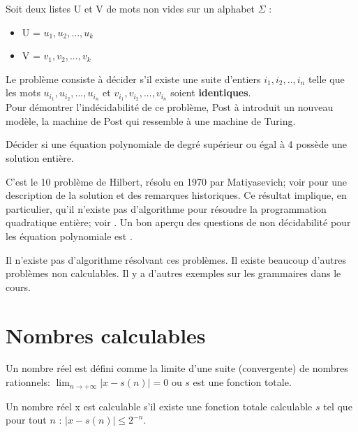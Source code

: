 \begin{mydef} Soit deux listes U et V
	de mots non vides sur un alphabet $\Sigma$ :
	\begin{itemize}
		\item U = ${u_1,u_2,...,u_k}$
		\item V = ${v_1,v_2,...,v_k}$
	\end{itemize}
	Le problème consiste à décider s’il existe une suite d'entiers
	$i_1,i_2,..,i_n$ telle que les mots $u_{i_1},u_{i_2},...,u_{i_n}$ et
	$v_{i_1},v_{i_2},...,v_{i_n}$ soient \textbf{identiques}. \\
	Pour démontrer l'indécidabilité de ce problème, Post à introduit un
	nouveau modèle, la machine de Post qui ressemble à une machine de Turing.
\end{mydef}

\begin{mydef}
  Décider si une équation
  polynomiale de degré supérieur ou égal à 4 possède une solution entière.
\end{mydef}
C'est le 10\ieme{} problème de Hilbert, résolu en 1970 par Matiyasevich;
voir \cite{davis1973hilbert} pour une description de la solution et des remarques historiques.
Ce résultat implique, en particulier, qu'il n'existe pas d'algorithme pour résoudre
la programmation quadratique entière; voir \cite{jeroslow1973there}.
Un bon aperçu des questions de non décidabilité pour les équation polynomiale est \cite{koenigsmann2014undecidability}.

Il n'existe pas d'algorithme résolvant ces problèmes. Il existe beaucoup
d'autres problèmes non calculables. Il y a d'autres exemples sur les grammaires dans le cours.

\section{Nombres calculables}
\label{sec:nombres_calculables}

\begin{mydef}
	Un nombre réel est défini comme la limite d'une suite (convergente) de
	nombres rationnels: $\lim_{n \rightarrow +\infty} |x-s(n)| = 0 $ ou $s$ est
	une fonction totale.
\end{mydef}

\begin{mydef}
	Un nombre réel x est calculable s’il existe une fonction totale
	calculable $s$ tel que pour tout $n$  : $|x-s(n)| \leq 2^{-n}$.
\end{mydef}

